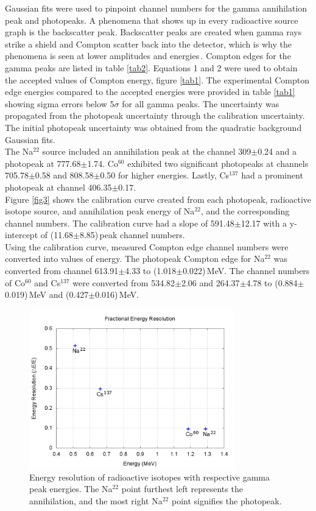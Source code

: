 \documentclass[aps,prl,twocolumn,superscriptaddress,nofootinbib]{revtex4-1}
\begin{document}
Gaussian fits were used to pinpoint channel numbers for the gamma annihilation peak and photopeaks. A phenomena that shows up in every radioactive source graph is the backscatter peak. Backscatter peaks are created when gamma rays strike a shield and Compton scatter back into the detector, which is why the phenomena is seen at lower amplitudes and energies\,\cite{7}. Compton edges for the gamma peaks are listed in table \ref{tab2}. Equations 1 and 2 were used to obtain the accepted values of Compton energy, figure \ref{tab1}. The experimental Compton edge energies compared to the accepted energies were provided in table \ref{tab1} showing sigma errors below 5$\sigma$ for all gamma peaks. The uncertainty was propagated from the photopeak uncertainty through the calibration uncertainty. The initial photopeak uncertainty was obtained from the quadratic background Gaussian fits.
\\
\indent The Na$^{22}$ source included an annihilation peak at the channel 309$\pm$0.24 and a photopeak at 777.68$\pm$1.74. Co$^{60}$ exhibited two significant photopeaks at channels 705.78$\pm$0.58 and 808.58$\pm$0.50 for higher energies. Lastly, Cs$^137$ had a prominent photopeak at channel 406.35$\pm$0.17.
\\
\indent Figure \ref{fig3} shows the calibration curve created from each photopeak, radioactive isotope source, and annihilation peak energy of Na$^22$, and the corresponding channel numbers. The calibration curve had a slope of 591.48$\pm$12.17 with a y-intercept of (11.68$\pm$8.85)\,peak channel numbers.
\\
\indent Using the calibration curve, measured Compton edge channel numbers were converted into values of energy. The photopeak Compton edge for Na$^{22}$ was converted from channel 613.91$\pm$4.33 to (1.018$\pm$0.022)\,MeV. The channel numbers of Co$^{60}$ and Cs$^{137}$ were converted from 534.82$\pm$2.06 and 264.37$\pm$4.78 to (0.884$\pm$0.019)\,MeV and (0.427$\pm$0.016)\,MeV.




\begin{figure}[h!]
  \begin{center}
\centerline{\includegraphics[width=3.5in]{frac.png}}
\caption{ \small{Energy resolution of radioactive isotopes with respective gamma peak energies. The Na$^{22}$ point furthest left represents the annihilation, and the most right Na$^{22}$ point signifies the photopeak. \label{figfrac}}}
  \end{center}
\end{figure}
\end{document}
